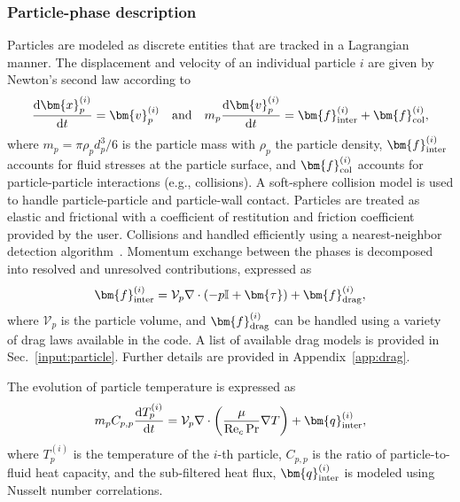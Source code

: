 \documentclass[12pt]{article}
\newcommand{\Rec}{\mbox{\rm Re}_c} %
\begin{document}
\subsubsection{Particle-phase description \label{sec:solid}}
Particles are modeled as discrete entities that are tracked in a Lagrangian manner. The displacement and velocity of an individual particle $i$ are given by Newton's second law according to
\begin{equation}
\frac{ {\rm d} \bm{x}_{p}^{(i)}}{ {\rm d} t} = \bm{v}_p^{(i)}\quad{\rm and}\quad m_p \frac{ {\rm d} \bm{v}_{p}^{(i)}}{ {\rm d} t} = \bm{f}_{\rm inter}^{(i)} + \bm{f}^{(i)}_{\rm col},
\end{equation}
where  $m_p = \pi \rho_p d_p^3 / 6$ is the particle mass with $\rho_p$ the particle density, $\bm{f}_{\rm inter}^{(i)}$ accounts for fluid stresses at the particle surface, and $\bm{f}^{(i)}_{\rm col}$ accounts for particle-particle interactions (e.g., collisions). A soft-sphere collision model is used to handle particle-particle and particle-wall contact. Particles are treated as elastic and frictional with a coefficient of restitution and friction coefficient provided by the user. Collisions and handled efficiently using a nearest-neighbor detection algorithm~\cite{capecelatro2013euler}. Momentum exchange between the phases is decomposed into resolved and unresolved contributions, expressed as
\begin{equation}\label{eq:finter}
\bm{f}_{\rm inter}^{(i)}  = \mathcal{V}_p \nabla \cdot \left(- p \mathbb{I}+\bm{\tau}\right) + \bm{f}_{\rm drag}^{(i)},
\end{equation}
where $\mathcal{V}_p$ is the particle volume, and $\bm{f}_{\rm drag}^{(i)}$ can be handled using a variety of drag laws available in the code. A list of available drag models is provided in Sec.~\ref{input:particle}. Further details are provided in Appendix~\ref{app:drag}.

The evolution of particle temperature is expressed as
\begin{equation}\label{dtdt}
m_p C_{p,p} \frac{ {\rm d} T_p^{(i)}}{ {\rm d}t}=  \mathcal{V}_p \nabla \cdot \left( \frac{\mu}{\Rec \Pr}\nabla T \right) + \bm{q}_{\rm inter}^{(i)},
\end{equation}
where $T_p^{(i)}$ is the temperature of the $i$-th particle, $C_{p,p}$ is the ratio of particle-to-fluid heat capacity, and the sub-filtered heat flux, $\bm{q}_{\rm inter}^{(i)}$ is modeled using Nusselt number correlations. %
\end{document}
